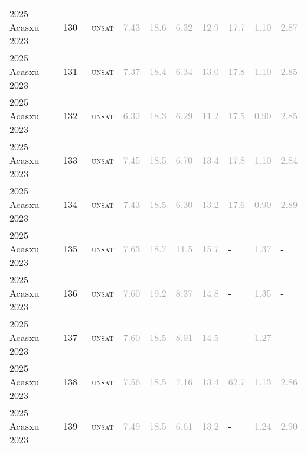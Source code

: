 \begin{center}
{\begin{longtable}{@{}llllllllll@{}}
2025 Acasxu 2023 & 130 & ~\textsc{unsat} & \textcolor{darkgray}{7.43} & \textcolor{darkgray}{18.6} & \textcolor{darkgray}{6.32} & \textcolor{darkgray}{12.9} & \textcolor{darkgray}{17.7} & \textcolor{darkgray}{1.10} & \textcolor{darkgray}{2.87} \\
2025 Acasxu 2023 & 131 & ~\textsc{unsat} & \textcolor{darkgray}{7.37} & \textcolor{darkgray}{18.4} & \textcolor{darkgray}{6.34} & \textcolor{darkgray}{13.0} & \textcolor{darkgray}{17.8} & \textcolor{darkgray}{1.10} & \textcolor{darkgray}{2.85} \\
2025 Acasxu 2023 & 132 & ~\textsc{unsat} & \textcolor{darkgray}{6.32} & \textcolor{darkgray}{18.3} & \textcolor{darkgray}{6.29} & \textcolor{darkgray}{11.2} & \textcolor{darkgray}{17.5} & \textcolor{darkgray}{0.90} & \textcolor{darkgray}{2.85} \\
2025 Acasxu 2023 & 133 & ~\textsc{unsat} & \textcolor{darkgray}{7.45} & \textcolor{darkgray}{18.5} & \textcolor{darkgray}{6.70} & \textcolor{darkgray}{13.4} & \textcolor{darkgray}{17.8} & \textcolor{darkgray}{1.10} & \textcolor{darkgray}{2.84} \\
2025 Acasxu 2023 & 134 & ~\textsc{unsat} & \textcolor{darkgray}{7.43} & \textcolor{darkgray}{18.5} & \textcolor{darkgray}{6.30} & \textcolor{darkgray}{13.2} & \textcolor{darkgray}{17.6} & \textcolor{darkgray}{0.90} & \textcolor{darkgray}{2.89} \\
2025 Acasxu 2023 & 135 & ~\textsc{unsat} & \textcolor{darkgray}{7.63} & \textcolor{darkgray}{18.7} & \textcolor{darkgray}{11.5} & \textcolor{darkgray}{15.7} & - & \textcolor{darkgray}{1.37} & - \\
2025 Acasxu 2023 & 136 & ~\textsc{unsat} & \textcolor{darkgray}{7.60} & \textcolor{darkgray}{19.2} & \textcolor{darkgray}{8.37} & \textcolor{darkgray}{14.8} & - & \textcolor{darkgray}{1.35} & - \\
2025 Acasxu 2023 & 137 & ~\textsc{unsat} & \textcolor{darkgray}{7.60} & \textcolor{darkgray}{18.5} & \textcolor{darkgray}{8.91} & \textcolor{darkgray}{14.5} & - & \textcolor{darkgray}{1.27} & - \\
2025 Acasxu 2023 & 138 & ~\textsc{unsat} & \textcolor{darkgray}{7.56} & \textcolor{darkgray}{18.5} & \textcolor{darkgray}{7.16} & \textcolor{darkgray}{13.4} & \textcolor{darkgray}{62.7} & \textcolor{darkgray}{1.13} & \textcolor{darkgray}{2.86} \\
2025 Acasxu 2023 & 139 & ~\textsc{unsat} & \textcolor{darkgray}{7.49} & \textcolor{darkgray}{18.5} & \textcolor{darkgray}{6.61} & \textcolor{darkgray}{13.2} & - & \textcolor{darkgray}{1.24} & \textcolor{darkgray}{2.90} \\

\end{longtable}}
\end{center}
